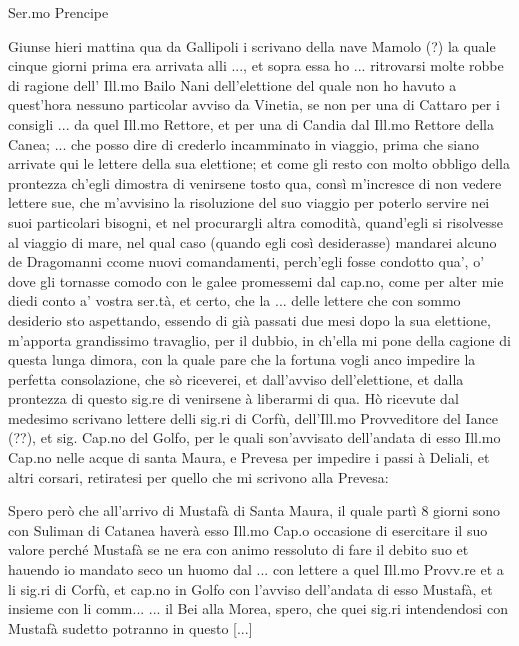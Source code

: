 
\begin{center}
Ser.mo Prencipe
\end{center}

Giunse hieri mattina qua da Gallipoli i scrivano della nave Mamolo (?)
la quale cinque  giorni prima era arrivata alli ...,  et sopra essa ho
...   ritrovarsi  molte  robbe  di  ragione dell'  Ill.mo  Bailo  Nani
dell'elettione del quale non ho havuto a quest'hora nessuno particolar
avviso da  Vinetia, se non  per una di  Cattaro per i consigli  ... da
quel Ill.mo  Rettore, et  per una di  Candia dal Ill.mo  Rettore della
Canea; ...  che  posso dire di crederlo incamminato  in viaggio, prima
che siano  arrivate qui  le lettere della  sua elettione; et  come gli
resto con molto obbligo  della prontezza ch'egli dimostra di venirsene
tosto qua, consì m'incresce di  non vedere lettere sue, che m'avvisino
la  risoluzione   del  suo  viaggio  per  poterlo   servire  nei  suoi
particolari bisogni, et nel  procurargli altra comodità, quand'egli si
risolvesse  al  viaggio di  mare,  nel  qual  caso (quando  egli  così
desiderasse) mandarei  alcuno de Dragomanni  ccome nuovi comandamenti,
perch'egli fosse  condotto qua',  o' dove gli  tornasse comodo  con le
galee promessemi dal cap.no, come  per alter mie diedi conto a' vostra
ser.tà, et certo, che la ... delle lettere che con sommo desiderio sto
aspettando, essendo  di già  passati due mesi  dopo la  sua elettione,
m'apporta  grandissimo travaglio, per  il dubbio,  in ch'ella  mi pone
della cagione di questa lunga dimora, con la quale pare che la fortuna
vogli  anco impedire la  perfetta consolazione,  che sò  riceverei, et
dall'avviso  dell'elettione, et  dalla prontezza  di questo  sig.re di
venirsene  à  liberarmi di  qua.  Hò  ricevute  dal medesimo  scrivano
lettere  delli sig.ri  di  Corfù, dell'Ill.mo  Provveditore del  Iance
(??), et sig. Cap.no del  Golfo, per le quali son'avvisato dell'andata
di  esso Ill.mo  Cap.no  nelle acque  di  santa Maura,  e Prevesa  per
impedire i  passi à Deliali,  et altri corsari, retiratesi  per quello
che mi scrivono alla Prevesa:

\startcifrato

Spero però che all'arrivo di Mustafà  di Santa Maura, il quale partì 8
giorni sono con Suliman di  Catanea haverà esso Ill.mo Cap.o occasione
di  esercitare  il suo  valore  perché Mustafà  se  ne  era con  animo
ressoluto di  fare il debito suo  et hauendo io mandato  seco un huomo
dal ... con lettere a quel Ill.mo Provv.re et a li sig.ri di Corfù, et
cap.no in Golfo  con l'avviso dell'andata di esso  Mustafà, et insieme
con  li  comm...  ...   il  Bei alla  Morea,  spero,  che quei  sig.ri
intendendosi con Mustafà sudetto potranno in questo [...]

